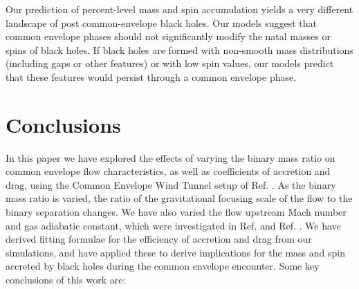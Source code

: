 Our prediction of percent-level mass and spin accumulation yields a very different landscape of post common-envelope black holes. Our models suggest that common envelope phases should not significantly modify the natal masses or spins of black holes. If black holes are formed with non-smooth  mass distributions (including gaps or other features) or with low spin values, our models predict that these features would persist through a common envelope phase. 

\vspace{5mm}
\section{Conclusions}\label{sec:conclusions}
In this paper we have explored the effects of varying the binary mass ratio on common envelope flow characteristics, as well as coefficients of accretion and drag, using the Common Envelope Wind Tunnel setup of Ref. \cite{MacLeod:2017}. As the binary mass ratio is varied, the ratio of the gravitational focusing scale of the flow to the binary separation changes.
We have also varied the flow upstream Mach number and gas adiabatic constant, which were investigated in Ref. \cite{MacLeod:2017} and Ref. \cite{MacLeod_2015}. We have derived fitting formulae for the efficiency of accretion and drag from our simulations, and have applied these to derive implications for the mass and spin accreted by black holes during the common envelope encounter. Some key conclusions of this work are:

